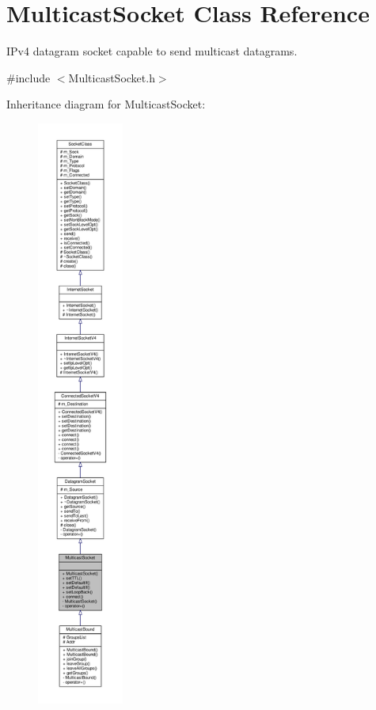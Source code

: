\hypertarget{classMulticastSocket}{}\section{Multicast\+Socket Class Reference}
\label{classMulticastSocket}


I\+Pv4 datagram socket capable to send multicast datagrams.  




{\ttfamily \#include $<$Multicast\+Socket.\+h$>$}



Inheritance diagram for Multicast\+Socket\+:\nopagebreak
\begin{figure}[H]
\begin{center}
\leavevmode
\includegraphics[height=550pt]{classMulticastSocket__inherit__graph}
\end{center}
\end{figure}
